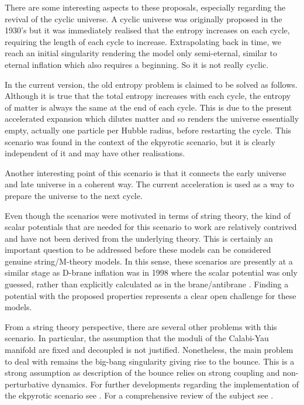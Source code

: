 There are some  interesting aspects to these proposals, 
especially regarding  the revival of the cyclic universe. A cyclic universe was originally proposed in the 1930's 
but it was immediately realised that the entropy increases on each cycle, requiring the length of
each cycle to increase. Extrapolating back in time, we reach 
an initial singularity rendering the model only semi-eternal,
similar to eternal inflation which also requires a beginning. So it is not really cyclic.

In the current version, the old entropy problem is claimed to be solved as follows. Although it is true that the total entropy 
 increases with each cycle, the entropy of matter is always the same 
at the end of each cycle. This is due to the present accelerated expansion
 which dilutes matter and so renders the universe essentially
 empty, actually one particle per Hubble radius, before restarting the cycle.
This scenario was found in the context of the ekpyrotic scenario,
but it is clearly independent of it and may have other  realisations.

Another interesting point of this scenario is that it connects the early
 universe and 
late universe in a coherent way. The current acceleration is used as a way 
 to prepare the universe to the next cycle.

 
Even though the scenarios were motivated in terms of string theory, the 
kind of scalar potentials that are needed for this scenario to work are relatively contrived and have not been 
derived from the underlying theory.
 This is certainly an important  question to be addressed before these models 
can be considered genuine string/M-theory models. In this sense, these scenarios are 
 presently at a similar stage as D-brane inflation was in 1998 where the scalar 
potential was only guessed, rather than explicitly calculated as in the 
brane/antibrane \cite{Burgess:2001fx, Kachru:2003sx}. 
Finding a potential with the 
proposed properties represents a clear open challenge for these models.
 
From a string theory perspective, there are several other problems with this scenario. 
In particular, the assumption that 
the moduli of the Calabi-Yau manifold are fixed and decoupled is not justified.
 Nonetheless, the main problem to deal with remains the big-bang singularity 
giving rise to the bounce. This is a strong assumption as description of the bounce relies on strong coupling and non-perturbative dynamics.
For further developments regarding the implementation of the ekpyrotic scenario see \cite{Buchbinder:2007ad}. For a comprehensive review of the subject see \cite{Lehners:2008vx}.


